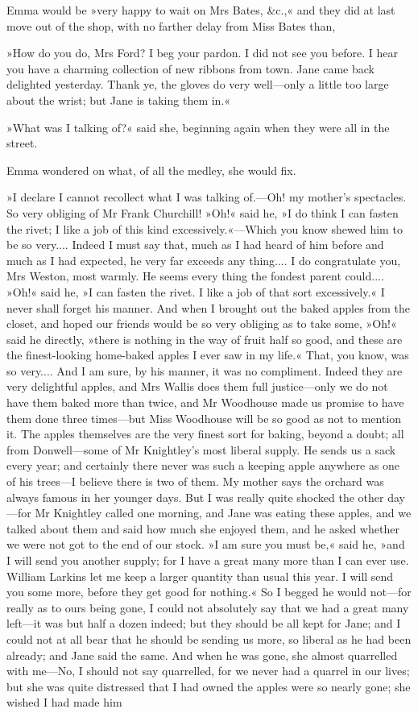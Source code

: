 Emma would be »very happy to wait on Mrs Bates, \&c.,« and they did at last move out of the shop, with no farther delay from Miss Bates than,

»How do you do, Mrs Ford? I beg your pardon. I did not see you before. I hear you have a charming collection of new ribbons from town. Jane came back delighted yesterday. Thank ye, the gloves do very well—only a little too large about the wrist; but Jane is taking them in.«

»What was I talking of?« said she, beginning again when they were all in the street.

Emma wondered on what, of all the medley, she would fix.

»I declare I cannot recollect what I was talking of.—Oh! my mother's spectacles. So very obliging of Mr Frank Churchill! »Oh!« said he, »I do think I can fasten the rivet; I like a job of this kind excessively.«—Which you know shewed him to be so very.... Indeed I must say that, much as I had heard of him before and much as I had expected, he very far exceeds any thing.... I do congratulate you, Mrs Weston, most warmly. He seems every thing the fondest parent could.... »Oh!« said he, »I can fasten the rivet. I like a job of that sort excessively.« I never shall forget his manner. And when I brought out the baked apples from the closet, and hoped our friends would be so very obliging as to take some, »Oh!« said he directly, »there is nothing in the way of fruit half so good, and these are the finest-looking home-baked apples I ever saw in my life.« That, you know, was so very.... And I am sure, by his manner, it was no compliment. Indeed they are very delightful apples, and Mrs Wallis does them full justice—only we do not have them baked more than twice, and Mr Woodhouse made us promise to have them done three times—but Miss Woodhouse will be so good as not to mention it. The apples themselves are the very finest sort for baking, beyond a doubt; all from Donwell—some of Mr Knightley's most liberal supply. He sends us a sack every year; and certainly there never was such a keeping apple anywhere as one of his trees—I believe there is two of them. My mother says the orchard was always famous in her younger days. But I was really quite shocked the other day—for Mr Knightley called one morning, and Jane was eating these apples, and we talked about them and said how much she enjoyed them, and he asked whether we were not got to the end of our stock. »I am sure you must be,« said he, »and I will send you another supply; for I have a great many more than I can ever use. William Larkins let me keep a larger quantity than usual this year. I will send you some more, before they get good for nothing.« So I begged he would not—for really as to ours being gone, I could not absolutely say that we had a great many left—it was but half a dozen indeed; but they should be all kept for Jane; and I could not at all bear that he should be sending us more, so liberal as he had been already; and Jane said the same. And when he was gone, she almost quarrelled with me—No, I should not say quarrelled, for we never had a quarrel in our lives; but she was quite distressed that I had owned the apples were so nearly gone; she wished I had made him 